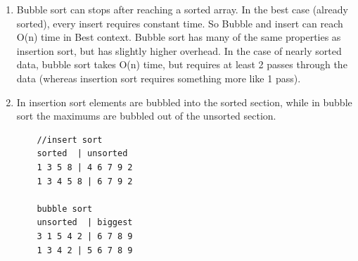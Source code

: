 \documentclass[a4paper,11pt,twoside]{book}
\begin{document}
\begin{enumerate}
	\item Bubble sort can stops after reaching a sorted array. In the best case (already sorted), every insert requires constant time. So Bubble and insert can reach O(n) time in Best context. Bubble sort has many of the same properties as insertion sort, but has slightly higher overhead. In the case of nearly sorted data, bubble sort takes O(n) time, but requires at least 2 passes through the data (whereas insertion sort requires something more like 1 pass).


	\item In insertion sort elements are bubbled into the sorted section, while in bubble sort the maximums are bubbled out of the unsorted section.

\begin{lstlisting}
	//insert sort
	sorted  | unsorted
	1 3 5 8 | 4 6 7 9 2
	1 3 4 5 8 | 6 7 9 2
	
	bubble sort
	unsorted  | biggest
	3 1 5 4 2 | 6 7 8 9
	1 3 4 2 | 5 6 7 8 9
\end{lstlisting}

\end{enumerate}  
\end{document}
